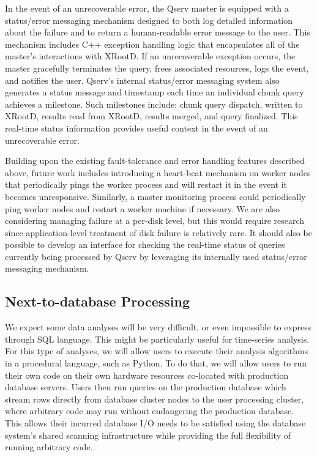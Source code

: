 \documentclass[DM,lsstdraft,toc]{lsstdoc}
\begin{document}
In the event of an unrecoverable error, the Qserv master is equipped
with a status/error messaging mechanism designed to both log detailed
information about the failure and to return a human-readable error
message to the user. This mechanism includes C++ exception handling
logic that encapsulates all of the master's interactions with
XRootD. If an unrecoverable exception occurs,
the master gracefully terminates the query, frees associated resources,
logs the event, and notifies the user. Qserv's internal status/error
messaging system also generates a status message and timestamp each time
an individual chunk query achieves a milestone. Such milestones include:
chunk query dispatch, written to XRootD,
results read from XRootD, results merged, and
query finalized. This real-time status information provides useful
context in the event of an unrecoverable error.

Building upon the existing fault-tolerance and error handling features
described above, future work includes introducing a heart-beat mechanism
on worker nodes that periodically pings the worker process and will
restart it in the event it becomes unresponsive. Similarly, a master
monitoring process could periodically ping worker nodes and restart a
worker machine if necessary. We are also considering managing failure at
a per-disk level, but this would require research since
application-level treatment of disk failure is relatively rare. It
should also be possible to develop an interface for checking the
real-time status of queries currently being processed by Qserv by
leveraging its internally used status/error messaging mechanism.

\subsection{Next-to-database
Processing}\label{next-to-database-processing}

We expect some data analyses will be very difficult, or even impossible
to express through SQL language. This might be particularly useful for
time-series analysis. For this type of analyses, we will allow users to
execute their analysis algorithms in a procedural language, such as
Python. To do that, we will allow users to run their own code on their
own hardware resources co-located with production database servers.
Users then run queries on the production database which stream rows
directly from database cluster nodes to the user processing cluster,
where arbitrary code may run without endangering the production
database. This allows their incurred database I/O needs to be satisfied
using the database system's shared scanning infrastructure while
providing the full flexibility of running arbitrary code.
\end{document}
